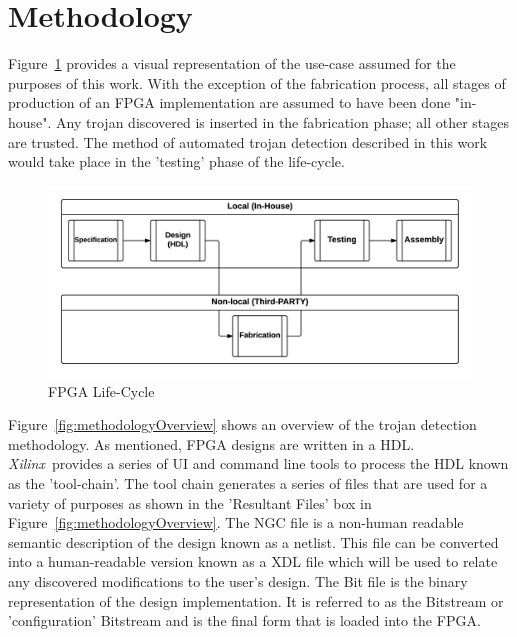 \documentclass[conference]{IEEEtran}
\newcommand{\Xilinx}{\textit{\gls{Xilinx}}~}
\begin{document}
\section{Methodology}
Figure~\ref{fig:Concept} provides a visual representation of the use-case assumed for the purposes of this work. 
With the exception of the fabrication process, all stages of production of an \acrshort{FPGA} implementation are assumed to have been done "in-house". 
Any trojan discovered is inserted in the fabrication phase; all other stages are trusted.  
The method of automated trojan detection described in this work would take place in the 'testing' phase of the life-cycle. 
\begin{figure}[h]
	\centering
	\includegraphics[width=1\linewidth]{../Thesis/Figures/Concept}
	\caption[FPGA Life-Cycle]{FPGA Life-Cycle}
	\label{fig:Concept}
\end{figure}
Figure~\ref{fig:methodologyOverview} shows an overview of the trojan detection methodology.
As mentioned, \acrshort{FPGA} designs are written in a \acrfull{HDL}.
\Xilinx provides a series of \acrfull{UI} and command line tools to process the \acrshort{HDL} known as the 'tool-chain'.
The tool chain generates a series of files that are used for a variety of purposes as shown in the 'Resultant Files' box in Figure~\ref{fig:methodologyOverview}.
The NGC file is a non-human readable semantic description of the design known as a netlist.
This file can be converted into a human-readable version known as a \acrfull{XDL} file which will be used to relate any discovered modifications to the user's design.
The Bit file is the binary representation of the design implementation.
It is referred to as the \gls{Bitstream} or 'configuration' \gls{Bitstream} and is the final form that is loaded into the \acrshort{FPGA}.
\end{document}
